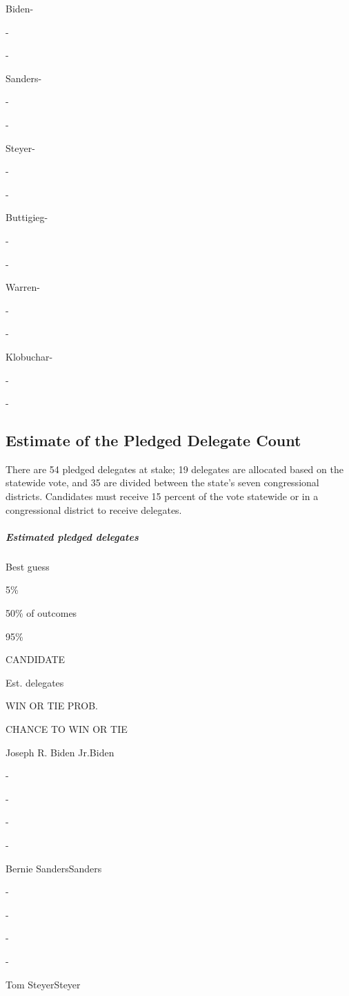 Biden-

-

-

Sanders-

-

-

Steyer-

-

-

Buttigieg-

-

-

Warren-

-

-

Klobuchar-

-

-

\hypertarget{estimate-of-the-pledged-delegate-count}{%
\subsection{Estimate of the Pledged Delegate
Count}\label{estimate-of-the-pledged-delegate-count}}

There are 54 pledged delegates at stake; 19 delegates are allocated
based on the statewide vote, and 35 are divided between the state's
seven congressional districts. Candidates must receive 15 percent of the
vote statewide or in a congressional district to receive delegates.

\hypertarget{estimated-pledged-delegates}{%
\subparagraph{Estimated pledged
delegates}\label{estimated-pledged-delegates}}

Best guess

5\%

50\% of outcomes

95\%

CANDIDATE

Est. delegates

WIN OR TIE PROB.

CHANCE TO WIN OR TIE

Joseph R. Biden Jr.Biden

-

-

-

-

Bernie SandersSanders

-

-

-

-

Tom SteyerSteyer

